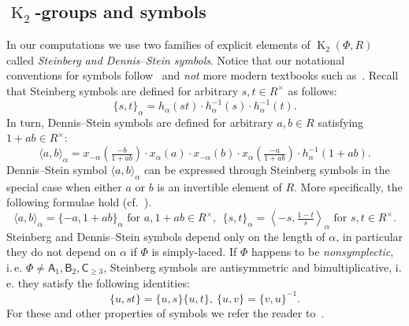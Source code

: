 \documentclass[oneside, 8pt]{amsart}
\theoremstyle{remark}
\theoremstyle{definition}
\numberwithin{lemma}{section}
\numberwithin{prop}{section}
\numberwithin{corollary}{section}
\numberwithin{externaltheorem}{section}
\DeclareMathOperator{\K}{K}
\newcommand{\rA}{\mathsf{A}}
\newcommand{\rB}{\mathsf{B}}
\newcommand{\rC}{\mathsf{C}}
\numberwithin{equation}{section}
\begin{document}
\subsection{$\K_2$-groups and symbols} In our computations we use two families of explicit elements of $\K_2(\Phi, R)$ called {\it Steinberg and Dennis--Stein symbols}. Notice that our notational conventions for symbols follow~\cite{DS73} and {\it not} more modern textbooks such as~\cite{Kbook}. Recall that Steinberg symbols are defined for arbitrary $s, t \in R^\times$ as follows:
\begin{equation} \label{eq:steinberg} \{ s, t \}_\alpha = h_\alpha(st) \cdot h_\alpha^{-1}(s) \cdot h_\alpha^{-1}(t). \end{equation}
In turn, Dennis--Stein symbols are defined for arbitrary $a, b\in R$ satisfying $1 + ab \in R^\times$:
\begin{equation} \label{eq:dennis-stein}  \langle a,b \rangle _ \alpha = x_{-\alpha}\left(\tfrac{- b}{1 + ab}\right) \cdot x_{\alpha}(a) \cdot x_{-\alpha}(b) \cdot x_{\alpha}\left(\tfrac{- a}{1+ab}\right) \cdot h_{\alpha}^{-1}(1 + ab). \end{equation} 
Dennis--Stein symbol $\langle a, b \rangle_\alpha$ can be expressed through Steinberg symbols in the special case when either $a$ or $b$ is an invertible element of $R$. More specifically, the following formulae hold (cf.~\cite[p.~250]{DS73}).
\begin{equation} \label{DS-S-relationship} \langle a, b \rangle_\alpha = \{-a, 1+ab\}_\alpha\text{ for } a, 1+ab\in R^\times,\ \
 \{ s, t \}_\alpha = \left\langle -s, \tfrac{1 - t}{s} \right\rangle_\alpha\text{ for } s, t\in R^\times. \end{equation}
Steinberg and Dennis--Stein symbols depend only on the length of $\alpha$, in particular they do not depend on $\alpha$ if $\Phi$ is simply-laced. If $\Phi$ happens to be {\it nonsymplectic}, i.\,e. $\Phi \neq \rA_1, \rB_2, \rC_{\geq 3}$, Steinberg symbols are antisymmetric and bimultiplicative, i.\,e. they satisfy the following identities: \begin{equation} \label{eq:symbol-properties} \{ u, st \} = \{ u, s\} \{ u, t \}, \ \{ u, v \} = \{ v, u\}^{-1}. \end{equation}
For these and other properties of symbols we refer the reader to~\cite{DS73}.
\end{document}
